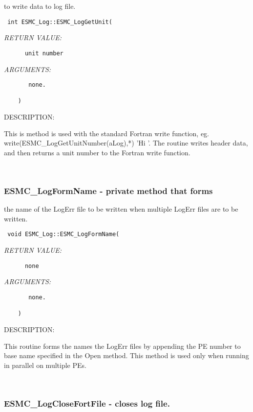    to write data to log file. 
  
\begin{verbatim} int ESMC_Log::ESMC_LogGetUnit(\end{verbatim}{\em RETURN VALUE:}
\begin{verbatim}      unit number \end{verbatim}{\em ARGUMENTS:}
\begin{verbatim}       none.
 
    )\end{verbatim}
{\sf DESCRIPTION:\\ }


   This is method is
   used with the standard Fortran write function, eg.
   write(ESMC\_LogGetUnitNumber(aLog),*) 'Hi '. 
   The routine writes header data, and
   then returns a unit number to the Fortran write function.
   
 
\mbox{}\hrulefill\ 
 
\subsubsection [ESMC\_LogFormName] {ESMC\_LogFormName - private method that forms}


    the name of the LogErr file to be written when multiple LogErr
    files are to be written.
  
\begin{verbatim} 
 void ESMC_Log::ESMC_LogFormName(
 \end{verbatim}{\em RETURN VALUE:}
\begin{verbatim}      none\end{verbatim}{\em ARGUMENTS:}
\begin{verbatim}       none.
 
    )\end{verbatim}
{\sf DESCRIPTION:\\ }


   This routine forms the names the LogErr files by appending the
   PE number to base name specified in the Open method.  This method
   is used only when running in parallel on multiple PEs.
   
 
\mbox{}\hrulefill\ 
 
\subsubsection [ESMC\_LogCloseFortFile] {ESMC\_LogCloseFortFile - closes log file. }


